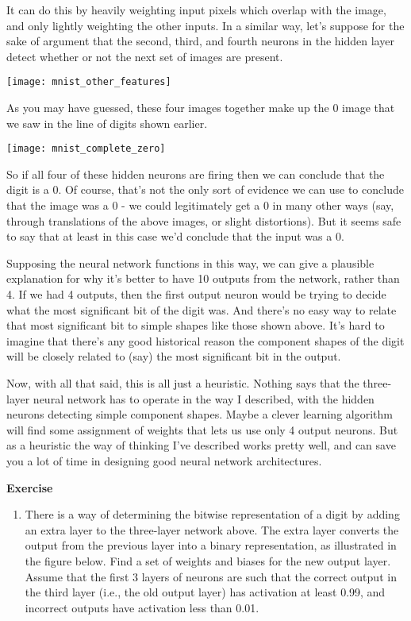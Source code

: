 It can do this by heavily weighting input pixels which overlap with the image, and only lightly weighting the other inputs. In a similar way, let's suppose for the sake of argument that the second, third, and fourth neurons in the hidden layer detect whether or not the next set of images are present.


\begin{marginfigure}
\texttt{[image: mnist\_other\_features]}
\end{marginfigure}

As you may have guessed, these four images together make up the 0 image that we saw in the line of digits shown earlier.

\begin{marginfigure}
\texttt{[image: mnist\_complete\_zero]}
\end{marginfigure}

So if all four of these hidden neurons are firing then we can conclude that the digit is a 0. Of course, that's not the only sort of evidence we can use to conclude that the image was a 0 - we could legitimately get a 0 in many other ways (say, through translations of the above images, or slight distortions). But it seems safe to say that at least in this case we'd conclude that the input was a 0.

Supposing the neural network functions in this way, we can give a plausible explanation for why it's better to have 10 outputs from the network, rather than 4. If we had 4 outputs, then the first output neuron would be trying to decide what the most significant bit of the digit was. And there's no easy way to relate that most significant bit to simple shapes like those shown above. It's hard to imagine that there's any good historical reason the component shapes of the digit will be closely related to (say) the most significant bit in the output.

Now, with all that said, this is all just a heuristic. Nothing says that the three-layer neural network has to operate in the way I described, with the hidden neurons detecting simple component shapes. Maybe a clever learning algorithm will find some assignment of weights that lets us use only 4 output neurons. But as a heuristic the way of thinking I've described works pretty well, and can save you a lot of time in designing good neural network architectures.

\textbf{Exercise}
\begin{enumerate}
\item 
There is a way of determining the bitwise representation of a digit by adding an extra layer to the three-layer network above. The extra layer converts the output from the previous layer into a binary representation, as illustrated in the figure below. Find a set of weights and biases for the new output layer. Assume that the first 3 layers of neurons are such that the correct output in the third layer (i.e., the old output layer) has activation at least 0.99, and incorrect outputs have activation less than 0.01. 
\end{enumerate}


